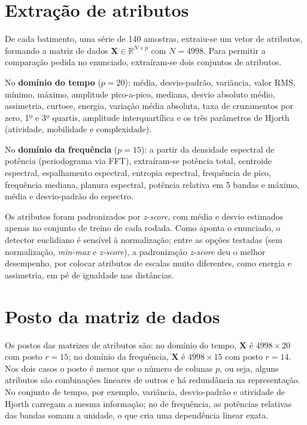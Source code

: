 \documentclass[12pt,a4paper]{scrartcl}
\begin{document}
\section{Extração de atributos}

De cada batimento, uma série de 140 amostras, extraiu-se um vetor de atributos, formando a matriz de dados $\mathbf{X} \in \mathbb{R}^{N \times p}$ com $N = 4998$. Para permitir a comparação pedida no enunciado, extraíram-se dois conjuntos de atributos.

No \textbf{domínio do tempo} ($p = 20$): média, desvio-padrão, variância, valor RMS, mínimo, máximo, amplitude pico-a-pico, mediana, desvio absoluto médio, assimetria, curtose, energia, variação média absoluta, taxa de cruzamentos por zero, 1º e 3º quartis, amplitude interquartílica e os três parâmetros de Hjorth (atividade, mobilidade e complexidade).

No \textbf{domínio da frequência} ($p = 15$): a partir da densidade espectral de potência (periodograma via FFT), extraíram-se potência total, centroide espectral, espalhamento espectral, entropia espectral, frequência de pico, frequência mediana, planura espectral, potência relativa em 5 bandas e máximo, média e desvio-padrão do espectro.

Os atributos foram padronizados por \emph{z-score}, com média e desvio estimados apenas no conjunto de treino de cada rodada. Como aponta o enunciado, o detector euclidiano é sensível à normalização; entre as opções testadas (sem normalização, \emph{min-max} e \emph{z-score}), a padronização \emph{z-score} deu o melhor desempenho, por colocar atributos de escalas muito diferentes, como energia e assimetria, em pé de igualdade nas distâncias.

\section{Posto da matriz de dados}

Os postos das matrizes de atributos são: no domínio do tempo, $\mathbf{X}$ é $4998 \times 20$ com posto $r = 15$; no domínio da frequência, $\mathbf{X}$ é $4998 \times 15$ com posto $r = 14$. Nos dois casos o posto é menor que o número de colunas $p$, ou seja, alguns atributos são combinações lineares de outros e há redundância na representação. No conjunto de tempo, por exemplo, variância, desvio-padrão e atividade de Hjorth carregam a mesma informação; no de frequência, as potências relativas das bandas somam a unidade, o que cria uma dependência linear exata.
\end{document}
